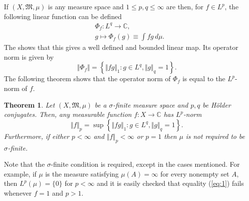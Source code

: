 \documentclass[12pt]{article}
\newtheorem*{theorem*}{Theorem}
\begin{document}
If $(X,\mathfrak{M},\mu)$ is any measure space and $1\le p,q\le \infty$ are  then, for $f\in L^p$, the following linear function can be defined
\begin{align*}
&\Phi_f\colon L^q\rightarrow\mathbb{C},\\
&g\mapsto\Phi_f(g)\equiv\int fg\,d\mu.
\end{align*}
The  shows that this gives a well defined and bounded linear map. Its operator norm is given by
\begin{equation*}
\Vert\Phi_f\Vert=\left\{\Vert fg\Vert_1:g\in L^q, \Vert g\Vert_q=1\right\}.
\end{equation*}
The following theorem shows that the operator norm of $\Phi_f$ is equal to the $L^p$-norm of $f$.

\begin{theorem*}
Let $(X,\mathfrak{M},\mu)$ be a $\sigma$-finite measure space and $p,q$ be H\"older conjugates. Then, any measurable function $f\colon X\rightarrow\mathbb{C}$ has $L^p$-norm
\begin{equation}\label{eq:1}
\Vert f\Vert_p=\sup\left\{\Vert fg\Vert_1: g\in L^q, \Vert g\Vert_q=1\right\}.
\end{equation}
Furthermore, if either $p<\infty$ and $\Vert f\Vert_p<\infty$ or $p=1$ then $\mu$ is not required to be $\sigma$-finite.
\end{theorem*}

Note that the $\sigma$-finite condition is required, except in the cases mentioned. For example, if $\mu$ is the measure satisfying $\mu(A)=\infty$ for every nonempty set $A$, then $L^p(\mu)=\{0\}$ for $p<\infty$ and it is easily checked that equality (\ref{eq:1}) fails whenever $f=1$ and $p>1$.

\end{document}
